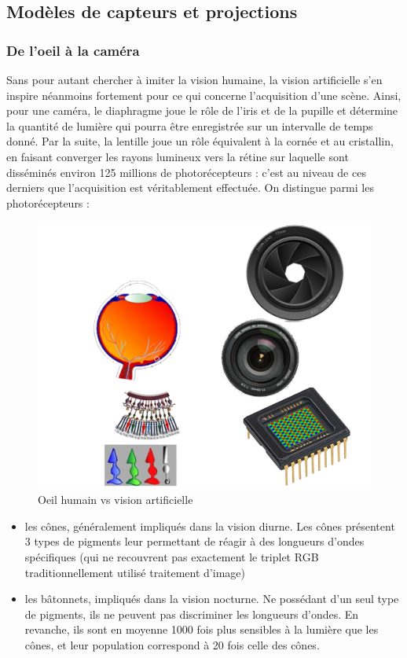  \subsection{Modèles de capteurs et projections}
 
 \subsubsection{De l'oeil à la caméra}
 
 Sans pour autant chercher à imiter la vision humaine, la vision artificielle s'en inspire néanmoins fortement pour ce qui concerne l'acquisition d'une scène. Ainsi, pour une caméra, le diaphragme joue le rôle de l'iris et de la pupille et détermine la quantité de lumière qui pourra être enregistrée sur un intervalle de temps donné. Par la suite, la lentille joue un rôle équivalent à la cornée et au cristallin, en faisant converger les rayons lumineux vers la rétine sur laquelle sont disséminés environ 125 millions de photorécepteurs : c'est au niveau de ces derniers que l'acquisition est véritablement effectuée. On distingue parmi les photorécepteurs :
 \begin{figure}[htp]
  \centering
  \includegraphics[width=.85\linewidth]{./intro/figures/oeil.png}
    \caption{\footnotesize{Oeil humain vs vision artificielle}}
\label{intro:fig11}
\end{figure}

 \begin{itemize}
  \item les cônes, généralement impliqués dans la vision diurne. Les cônes présentent 3 types de pigments leur permettant de réagir à des longueurs d'ondes spécifiques (qui ne recouvrent pas exactement le triplet RGB traditionnellement utilisé traitement d'image)
  \item les bâtonnets, impliqués dans la vision nocturne. Ne possédant d'un seul type de pigments, ils ne peuvent pas discriminer les longueurs d'ondes. En revanche, ils sont en moyenne 1000 fois plus sensibles à la lumière que les cônes, et leur population correspond à 20 fois celle des cônes.
 \end{itemize}

